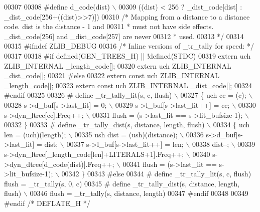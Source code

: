 \begin{DoxyCode}
00307 
00308 \textcolor{preprocessor}{#define d\_code(dist) \(\backslash\)}
00309 \textcolor{preprocessor}{   ((dist) < 256 ? \_dist\_code[dist] : \_dist\_code[256+((dist)>>7)])}
00310 \textcolor{comment}{/* Mapping from a distance to a distance code. dist is the distance - 1 and}
00311 \textcolor{comment}{ * must not have side effects. \_dist\_code[256] and \_dist\_code[257] are never}
00312 \textcolor{comment}{ * used.}
00313 \textcolor{comment}{ */}
00314 
00315 \textcolor{preprocessor}{#ifndef ZLIB\_DEBUG}
00316 \textcolor{comment}{/* Inline versions of \_tr\_tally for speed: */}
00317 
00318 \textcolor{preprocessor}{#if defined(GEN\_TREES\_H) || !defined(STDC)}
00319   \textcolor{keyword}{extern} uch ZLIB\_INTERNAL \_length\_code[];
00320   \textcolor{keyword}{extern} uch ZLIB\_INTERNAL \_dist\_code[];
00321 \textcolor{preprocessor}{#else}
00322   \textcolor{keyword}{extern} \textcolor{keyword}{const} uch ZLIB\_INTERNAL \_length\_code[];
00323   \textcolor{keyword}{extern} \textcolor{keyword}{const} uch ZLIB\_INTERNAL \_dist\_code[];
00324 \textcolor{preprocessor}{#endif}
00325 
00326 \textcolor{preprocessor}{# define \_tr\_tally\_lit(s, c, flush) \(\backslash\)}
00327 \textcolor{preprocessor}{  \{ uch cc = (c); \(\backslash\)}
00328 \textcolor{preprocessor}{    s->d\_buf[s->last\_lit] = 0; \(\backslash\)}
00329 \textcolor{preprocessor}{    s->l\_buf[s->last\_lit++] = cc; \(\backslash\)}
00330 \textcolor{preprocessor}{    s->dyn\_ltree[cc].Freq++; \(\backslash\)}
00331 \textcolor{preprocessor}{    flush = (s->last\_lit == s->lit\_bufsize-1); \(\backslash\)}
00332 \textcolor{preprocessor}{   \}}
00333 \textcolor{preprocessor}{# define \_tr\_tally\_dist(s, distance, length, flush) \(\backslash\)}
00334 \textcolor{preprocessor}{  \{ uch len = (uch)(length); \(\backslash\)}
00335 \textcolor{preprocessor}{    ush dist = (ush)(distance); \(\backslash\)}
00336 \textcolor{preprocessor}{    s->d\_buf[s->last\_lit] = dist; \(\backslash\)}
00337 \textcolor{preprocessor}{    s->l\_buf[s->last\_lit++] = len; \(\backslash\)}
00338 \textcolor{preprocessor}{    dist--; \(\backslash\)}
00339 \textcolor{preprocessor}{    s->dyn\_ltree[\_length\_code[len]+LITERALS+1].Freq++; \(\backslash\)}
00340 \textcolor{preprocessor}{    s->dyn\_dtree[d\_code(dist)].Freq++; \(\backslash\)}
00341 \textcolor{preprocessor}{    flush = (s->last\_lit == s->lit\_bufsize-1); \(\backslash\)}
00342 \textcolor{preprocessor}{  \}}
00343 \textcolor{preprocessor}{#else}
00344 \textcolor{preprocessor}{# define \_tr\_tally\_lit(s, c, flush) flush = \_tr\_tally(s, 0, c)}
00345 \textcolor{preprocessor}{# define \_tr\_tally\_dist(s, distance, length, flush) \(\backslash\)}
00346 \textcolor{preprocessor}{              flush = \_tr\_tally(s, distance, length)}
00347 \textcolor{preprocessor}{#endif}
00348 
00349 \textcolor{preprocessor}{#endif }\textcolor{comment}{/* DEFLATE\_H */}\textcolor{preprocessor}{}
\end{DoxyCode}
